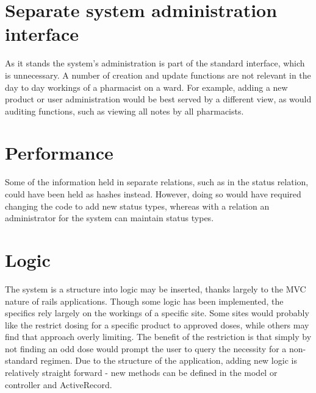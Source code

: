 \documentclass[letterpaper]{amsart}
\begin{document}
\section{Separate system administration interface}
As it stands the system's administration is part of the standard interface, which is unnecessary.  A number of creation and update functions are not relevant in the day to day workings of a pharmacist on a ward.  For example, adding a new product or user administration would be best served by a different view, as would auditing functions, such as viewing all notes by all pharmacists.
\section{Performance}
Some of the information held in separate relations, such as in the status relation, could have been held as hashes instead.  However, doing so would have required changing the code to add new status types, whereas with a relation an administrator for the system can maintain status types.
\section{Logic}
The system is a structure into logic may be inserted, thanks largely to the MVC nature of rails applications.  Though some logic has been implemented, the specifics rely largely on the workings of a specific site.  Some sites would probably like the restrict dosing for a specific product to approved doses, while others may find that approach overly limiting.  The benefit of the restriction is that simply by not finding an odd dose would prompt the user to query the necessity for a non-standard regimen.
Due to the structure of the application, adding new logic is relatively straight forward - new methods can be defined in the model or controller and ActiveRecord. 
\end{document}
